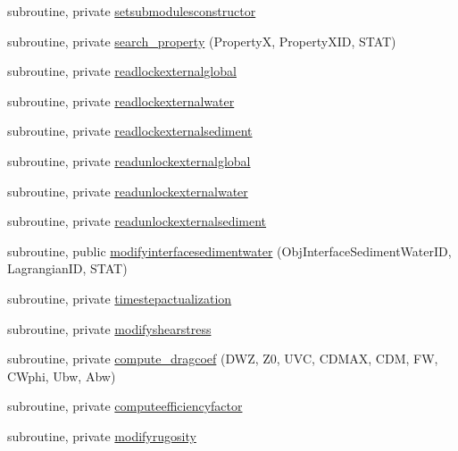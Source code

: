 \begin{DoxyCompactItemize}
\item 
subroutine, private \mbox{\hyperlink{namespacemoduleinterfacesedimentwater_a5922862ceb22f053a7ddf81b53a0be8c}{setsubmodulesconstructor}}
\item 
subroutine, private \mbox{\hyperlink{namespacemoduleinterfacesedimentwater_ae241bc3d883ac6be0459ecc4b5128d68}{search\+\_\+property}} (PropertyX, Property\+X\+ID, S\+T\+AT)
\item 
subroutine, private \mbox{\hyperlink{namespacemoduleinterfacesedimentwater_a4e44b21fdb18ed4d0fbeb1a77a327fff}{readlockexternalglobal}}
\item 
subroutine, private \mbox{\hyperlink{namespacemoduleinterfacesedimentwater_abd721cef18474ae3e82464d38e46a5e1}{readlockexternalwater}}
\item 
subroutine, private \mbox{\hyperlink{namespacemoduleinterfacesedimentwater_a0c18da6cbbd1ae812489854544d199b6}{readlockexternalsediment}}
\item 
subroutine, private \mbox{\hyperlink{namespacemoduleinterfacesedimentwater_a3b4fc7f1a3bccb01412713961a441cf0}{readunlockexternalglobal}}
\item 
subroutine, private \mbox{\hyperlink{namespacemoduleinterfacesedimentwater_a23d9e5cbe8c23621607cbca34d93c7f0}{readunlockexternalwater}}
\item 
subroutine, private \mbox{\hyperlink{namespacemoduleinterfacesedimentwater_a6b368a5d3a18b3829f9bd022591d794a}{readunlockexternalsediment}}
\item 
subroutine, public \mbox{\hyperlink{namespacemoduleinterfacesedimentwater_ac36014e82a94f1ba694775e21f24b005}{modifyinterfacesedimentwater}} (Obj\+Interface\+Sediment\+Water\+ID, Lagrangian\+ID, S\+T\+AT)
\item 
subroutine, private \mbox{\hyperlink{namespacemoduleinterfacesedimentwater_acc1eb6dcb216d902e358a53eb7c1604d}{timestepactualization}}
\item 
subroutine, private \mbox{\hyperlink{namespacemoduleinterfacesedimentwater_a959fd8b47379cd24947cb35417c1563e}{modifyshearstress}}
\item 
subroutine, private \mbox{\hyperlink{namespacemoduleinterfacesedimentwater_ab7293afe1dc4a5090663cd0d773d6e88}{compute\+\_\+dragcoef}} (D\+WZ, Z0, U\+VC, C\+D\+M\+AX, C\+DM, FW, C\+Wphi, Ubw, Abw)
\item 
subroutine, private \mbox{\hyperlink{namespacemoduleinterfacesedimentwater_a0e6b11bab2cf3a9864f9e36970079830}{computeefficiencyfactor}}
\item 
subroutine, private \mbox{\hyperlink{namespacemoduleinterfacesedimentwater_aabfaa7472b679988fdb0647b38a7b879}{modifyrugosity}}

\end{DoxyCompactItemize}
